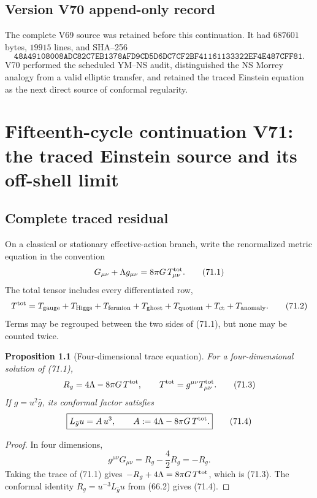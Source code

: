 \documentclass[11pt]{article}
\newtheorem{proposition}[theorem]{Proposition}
\theoremstyle{remark}
\begin{document}
\section*{Version V70 append-only record}
The complete V69 source was retained before this continuation.  It
had \(687601\) bytes, \(19915\) lines, and SHA--256
\[
 \texttt{48A49108008ADC82C7EB1378AFD9CD5D6DC7CF2BF41161133322EF4E487CFF81}.
\]
V70 performed the scheduled YM--NS audit, distinguished the NS
Morrey analogy from a valid elliptic transfer, and retained the
traced Einstein equation as the next direct source of conformal
regularity.

\chapter{Fifteenth-cycle continuation V71: the traced Einstein source and its off-shell limit}
\label{sec:v15v71}

\section{Complete traced residual}

On a classical or stationary effective-action branch, write the
renormalized metric equation in the convention
\[
 G_{\mu\nu}+\Lambda g_{\mu\nu}
 =
 8\pi G\,T^{\rm tot}_{\mu\nu}.                         \tag{71.1}
\]
The total tensor includes every differentiated row,
\[
 T^{\rm tot}
 =
 T_{\rm gauge}+T_{\rm Higgs}+T_{\rm fermion}
 +T_{\rm ghost}+T_{\rm quotient}
 +T_{\rm ct}+T_{\rm anomaly}.                         \tag{71.2}
\]
Terms may be regrouped between the two sides of (71.1), but none
may be counted twice.

\begin{proposition}[Four-dimensional trace equation]
\label{prop:v15v71-trace}
For a four-dimensional solution of (71.1),
\[
 R_g=4\Lambda-8\pi G\,T^{\rm tot},\qquad
 T^{\rm tot}=g^{\mu\nu}T^{\rm tot}_{\mu\nu}.           \tag{71.3}
\]
If \(g=u^2\bar g\), its conformal factor satisfies
\[
 \boxed{
 L_{\bar g}u=A\,u^3,\qquad
 A:=4\Lambda-8\pi G\,T^{\rm tot}.}                    \tag{71.4}
\]
\end{proposition}

\begin{proof}
In four dimensions,
\[
 g^{\mu\nu}G_{\mu\nu}
 =
 R_g-\frac42R_g=-R_g.
\]
Taking the trace of (71.1) gives
\(-R_g+4\Lambda=8\pi G\,T^{\rm tot}\), which is
(71.3).  The conformal identity \(R_g=u^{-3}L_{\bar g}u\)
from (66.2) gives (71.4).
\end{proof}
\end{document}
